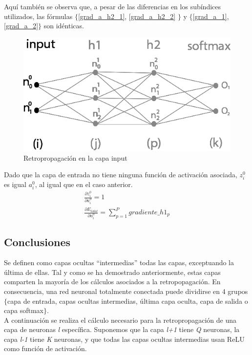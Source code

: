 Aquí también se observa que, a pesar de las diferencias en los subíndices utilizados, las fórmulas $\{$\ref{grad_a_h2_1}, \ref{grad_a_h2_2} $\}$ y $\{$\ref{grad_a_1}, \ref{grad_a_2}$\}$ son idénticas.

\begin{figure}[H]
	\centering
	\includegraphics[scale=0.35]{imagenes/nn_2_capa_input.jpg}  
	\caption{Retropropagación en la capa input}
	\label{fig:nn_2_capa_input}
\end{figure}

Dado que la capa de entrada no tiene ninguna función de activación asociada, $z^0_i$ es igual $a^0_i$, al igual que en el caso anterior. \\

\begin{gather}
	\frac{\partial z^0_i }{\partial a^0_i } = 1 \\
	\frac{\partial E_{total}}{\partial a^0_i} = \sum_{p=1}^{P} gradiente\_h1_p
\end{gather}

\subsection{Conclusiones}
Se definen como capas ocultas ``intermedias'' todas las capas, exceptuando la última de ellas. Tal y como se ha demostrado anteriormente, estas capas comparten la mayoría de los cálculos asociados a la retropopagación. En consecuencia, una red neuronal totalmente conectada puede dividirse en 4 grupos $\{$capa de entrada, capas ocultas intermedias, última capa oculta, capa de salida o capa softmax$\}$. \\
A continuación se realiza el cálculo necesario para la retropropagación de una capa de neuronas \textit{l} específica. Suponemos que la capa \textit{l+1} tiene \textit{Q} neuronas, la capa \textit{l-1} tiene \textit{K} neuronas, y que todas las capas ocultas intermedias usan ReLU como función de activación. \\


